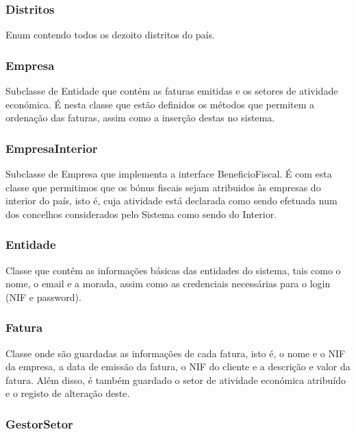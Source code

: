 \documentclass[a4paper]{article}
\begin{document}
\subsubsection{Distritos} %

Enum contendo todos os dezoito distritos do país.


\subsubsection{Empresa} %

Subclasse de Entidade que contém as faturas emitidas e os setores de atividade económica. É nesta classe que estão definidos os métodos que permitem a ordenação das faturas, assim como a inserção destas no sistema.


\subsubsection{EmpresaInterior} %

Subclasse de Empresa que implementa a interface BeneficioFiscal. É com esta classe que permitimos que os bónus fiscais sejam atribuidos às empresas do interior do país, isto é, cuja atividade está declarada como sendo efetuada num dos concelhos considerados pelo Sistema como sendo do Interior.


\subsubsection{Entidade} %

Classe que contém as informações básicas das entidades do sistema, tais como o nome, o email e a morada, assim como as credenciais necessárias para o login (NIF e password).


\subsubsection{Fatura} %

Classe onde são guardadas as informações de cada fatura, isto é, o nome e o NIF da empresa, a data de emissão da fatura, o NIF do cliente e a descrição e valor da fatura. Além disso, é também guardado o setor de atividade económica atribuído e o registo de alteração deste. 


\subsubsection{GestorSetor} %
\end{document}
